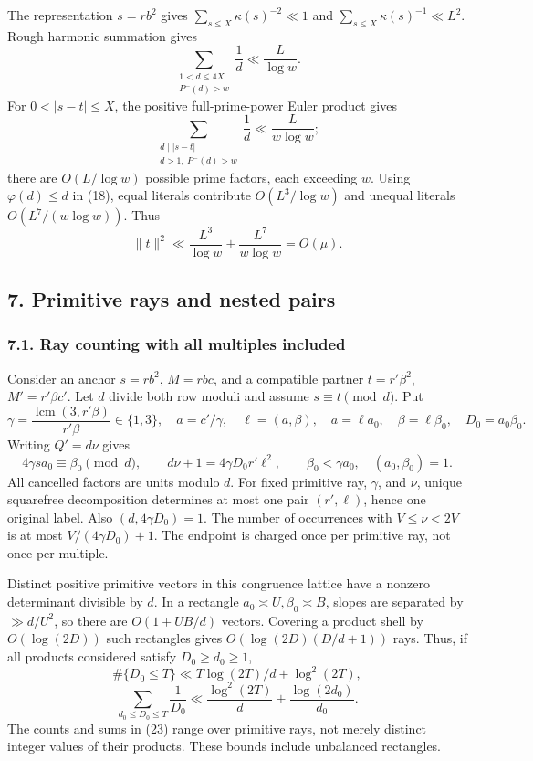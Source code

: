 \documentclass[
  english,
  11pt,
]{article}
\begin{document}
The representation \(s=rb^2\) gives \(\sum_{s\le X}\kappa(s)^{-2}\ll1\)
and \(\sum_{s\le X}\kappa(s)^{-1}\ll L^2\). Rough harmonic summation
gives \[
\sum_{\substack{1<d\le4X\\P^-(d)>w}}\frac1d\ll\frac L{\log w}.
\] For \(0<|s-t|\le X\), the positive full-prime-power Euler product
gives \[
\sum_{\substack{d\mid |s-t|\\d>1,\ P^-(d)>w}}\frac1d
\ll\frac{L}{w\log w};
\] there are \(O(L/\log w)\) possible prime factors, each exceeding
\(w\). Using \(\varphi(d)\le d\) in (18), equal literals contribute
\(O(L^3/\log w)\) and unequal literals \(O(L^7/(w\log w))\). Thus \[
\|t\|^2\ll\frac{L^3}{\log w}+\frac{L^7}{w\log w}=O(\mu). \tag{21}
\]

\subsection{7. Primitive rays and nested
pairs}\label{primitive-rays-and-nested-pairs}

\subsubsection{7.1. Ray counting with all multiples
included}\label{ray-counting-with-all-multiples-included}

Consider an anchor \(s=rb^2\), \(M=rbc\), and a compatible partner
\(t=r'\beta^2\), \(M'=r'\beta c'\). Let \(d\) divide both row moduli and
assume \(s\equiv t\pmod d\). Put \[
\gamma=\frac{\operatorname{lcm}(3,r'\beta)}{r'\beta}\in\{1,3\},\quad
a=c'/\gamma,\quad \ell=(a,\beta),\quad
a=\ell a_0,\quad \beta=\ell\beta_0,\quad D_0=a_0\beta_0.
\] Writing \(Q'=d\nu\) gives \[
4\gamma s a_0\equiv\beta_0\pmod d,\qquad
d\nu+1=4\gamma D_0r'\ell^2,\qquad
\beta_0<\gamma a_0,\quad(a_0,\beta_0)=1. \tag{22}
\] All cancelled factors are units modulo \(d\). For fixed primitive
ray, \(\gamma\), and \(\nu\), unique squarefree decomposition determines
at most one pair \((r',\ell)\), hence one original label. Also
\((d,4\gamma D_0)=1\). The number of occurrences with \(V\le\nu<2V\) is
at most \(V/(4\gamma D_0)+1\). The endpoint is charged once per
primitive ray, not once per multiple.

Distinct positive primitive vectors in this congruence lattice have a
nonzero determinant divisible by \(d\). In a rectangle
\(a_0\asymp U,\beta_0\asymp B\), slopes are separated by \(\gg d/U^2\),
so there are \(O(1+UB/d)\) vectors. Covering a product shell by
\(O(\log(2D))\) such rectangles gives \(O(\log(2D)(D/d+1))\) rays. Thus,
if all products considered satisfy \(D_0\ge d_0\ge1\), \[
\#\{D_0\le T\}\ll T\log(2T)/d+\log^2(2T),
\] \[
\sum_{d_0\le D_0\le T}\frac1{D_0}
\ll\frac{\log^2(2T)}d+\frac{\log(2d_0)}{d_0}. \tag{23}
\] The counts and sums in (23) range over primitive rays, not merely
distinct integer values of their products. These bounds include
unbalanced rectangles.
\end{document}
